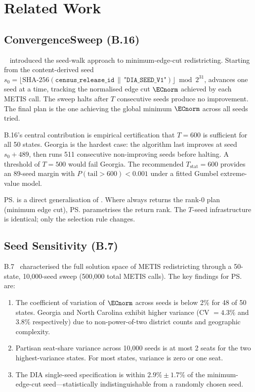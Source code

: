 \section{Related Work}
\label{sec:related-work}

\subsection{ConvergenceSweep (B.16)}

\cs{}~\citep{b16paper} introduced the seed-walk approach to minimum-edge-cut
redistricting.
Starting from the content-derived seed $s_0 = \lfloor \text{SHA-256}(\texttt{census\_release\_id}
\,\|\, \texttt{"DIA\_SEED\_V1"}) \rfloor \bmod 2^{31}$, \cs{} advances one seed at
a time, tracking the normalised edge cut $\ECnorm$ achieved by each METIS
call.
The sweep halts after $T$ consecutive seeds produce no improvement.
The final plan is the one achieving the global minimum $\ECnorm$ across all
seeds tried.

B.16's central contribution is empirical certification that $T = 600$ is
sufficient for all 50 states.
Georgia is the hardest case: the algorithm last improves at seed $s_0 + 489$,
then runs 511 consecutive non-improving seeds before halting.
A threshold of $T = 500$ would fail Georgia.
The recommended $T_{\mathrm{stat}} = 600$ provides an 89-seed margin with
$P(\mathrm{tail} > 600) < 0.001$ under a fitted Gumbel extreme-value model.

\ps{} is a direct generalisation of \cs{}.
Where \cs{} always returns the rank-0 plan (minimum edge cut), \ps{}
parametrises the return rank.
The $T$-seed infrastructure is identical; only the selection rule changes.

\subsection{Seed Sensitivity (B.7)}

B.7~\citep{b7paper} characterised the full solution space of METIS
redistricting through a 50-state, 10,000-seed sweep (500,000 total METIS
calls).
The key findings for \ps{} are:
\begin{enumerate}
\item The coefficient of variation of $\ECnorm$ across seeds is below 2\%
      for 48 of 50 states.
      Georgia and North Carolina exhibit higher variance (CV $= 4.3\%$ and
      $3.8\%$ respectively) due to non-power-of-two district counts and
      geographic complexity.
\item Partisan seat-share variance across 10,000 seeds is at most 2 seats
      for the two highest-variance states.
      For most states, variance is zero or one seat.
\item The DIA single-seed specification is within $2.9\% \pm 1.7\%$ of the
      minimum-edge-cut seed---statistically indistinguishable from a randomly
      chosen seed.
\end{enumerate}


